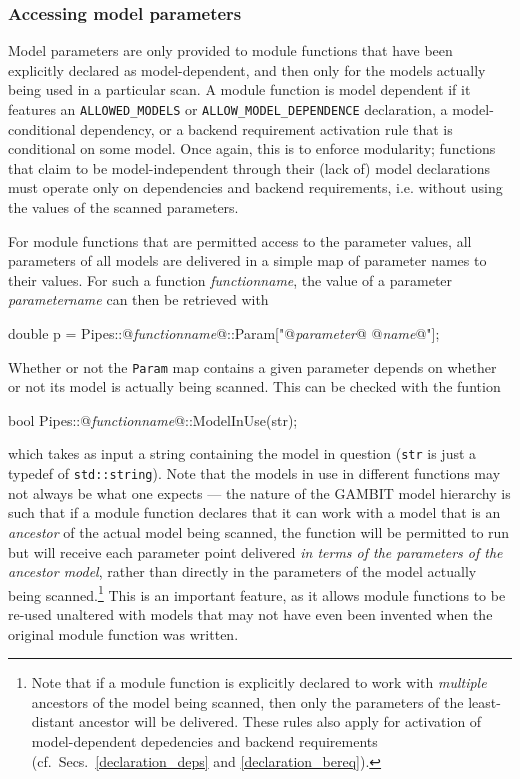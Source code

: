 \documentclass[pdftex,twocolumn,epjc3_preprint,runningheads]{svjour3}
\renewcommand{\_}{\discretionary{\underscore}{}{\underscore}}
\newcommand{\metavarf}[1]{\textit{\color{darkgreen}\footnotesize\textrm{#1}}}
\newcommand{\metavar}{\metavarf}
\newcommand{\gambit}{\textsf{GAMBIT}\xspace}
\newcommand{\GB}{\gambit}
\begin{document}
\subsubsection{Accessing model parameters}
\label{param_pipe}

Model parameters are only provided to module functions that have been explicitly declared as model-dependent, and then only for the models actually being used in a particular scan.  A module function is model dependent if it features an \lstinline{ALLOWED_MODELS} or \lstinline{ALLOW_MODEL_DEPENDENCE} declaration, a model-conditional dependency, or a backend requirement activation rule that is conditional on some model.  Once again, this is to enforce modularity; functions that claim to be model-independent through their (lack of) model declarations must operate only on dependencies and backend requirements, i.e. without using the values of the scanned parameters.

For module functions that are permitted access to the parameter values, all parameters of all models are delivered in a simple map of parameter names to their values.  For such a function \metavar{function\_name}, the value of a parameter \metavar{parameter\_name} can then be retrieved with
\begin{lstcpp}
double p = Pipes::@\metavar{function\_name}@::Param["@\metavar{parameter\_}@
 @\metavar{name}@"];
\end{lstcpp}

Whether or not the \lstinline{Param} map contains a given parameter depends on whether or not its model is actually being scanned.  This can be checked with the funtion
\begin{lstcpp}
bool Pipes::@\metavar{function\_name}@::ModelInUse(str);
\end{lstcpp}
which takes as input a string containing the model in question (\lstinline{str} is just a typedef of \lstinline{std::string}).  Note that the models in use in different functions may not always be what one expects --- the nature of the \GB model hierarchy is such that if a module function declares that it can work with a model that is an \textit{ancestor} of the actual model being scanned, the function will be permitted to run but will receive each parameter point delivered \textit{in terms of the parameters of the ancestor model}, rather than directly in the parameters of the model actually being scanned.\footnote{Note that if a module function is explicitly declared to work with \textit{multiple} ancestors of the model being scanned, then only the parameters of the least-distant ancestor will be delivered.  These rules also apply for activation of model-dependent depedencies and backend requirements (cf.\ Secs.\ \ref{declaration_deps} and \ref{declaration_bereq}).}  This is an important feature, as it allows module functions to be re-used unaltered with models that may not have even been invented when the original module function was written.
\end{document}
